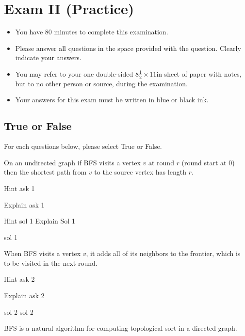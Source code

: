 \chapter{Exam II (Practice)}
\label{ch:examii-practice}

\begin{preamble}
\begin{itemize}
\item You have 80 minutes to complete this examination.
\item Please answer all questions in the space provided with the
  question.  Clearly indicate your answers.
\item You may refer to your one double-sided $8\frac{1}{2} \times 11$in
  sheet of paper with notes, but to no other person or source, during the
  examination.

\item Your answers for this exam must be written in blue or black ink.

\end{itemize}
\end{preamble}


\section{True or False}

\begin{problem}[14.][BFS]
For each questions below, please select True or False.

\asktf[2.0]

On an undirected graph if  BFS visits a vertex $v$ at round $r$ (round
start at $0$) then the shortest path from $v$ to the source vertex has
length $r$.

\hint
Hint  ask 1

\explain 
Explain  ask 1

\solt
\hint Hint sol 1
\explain Explain Sol 1

\explain  sol 1

\asktf

When BFS visits a vertex $v$, it adds all of its neighbors to the
frontier, which is to be visited in the next round.

\hint
Hint ask 2

\explain 
Explain  ask 2

\solf
\hint sol 2
\explain sol 2

\asktf

BFS is a natural algorithm for computing topological sort in a directed graph.

\solf

\end{problem}


